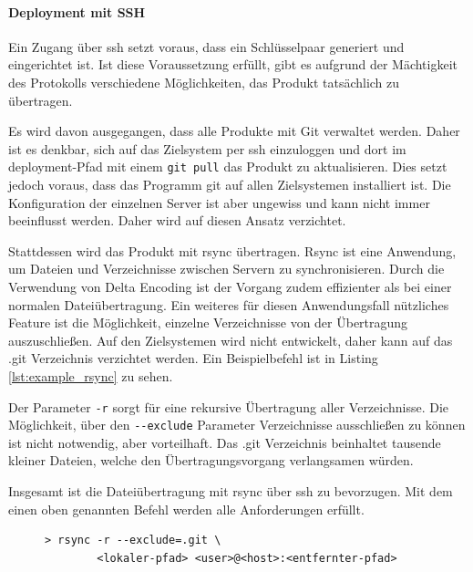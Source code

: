 \paragraph{Deployment mit SSH} %
\label{par:deployment_mit_ssh}

Ein Zugang über \gls{ssh} setzt voraus, dass ein Schlüsselpaar generiert und eingerichtet ist. Ist diese Voraussetzung erfüllt, gibt es aufgrund der Mächtigkeit des Protokolls verschiedene Möglichkeiten, das Produkt tatsächlich zu übertragen.

Es wird davon ausgegangen, dass alle Produkte mit Git verwaltet werden. Daher ist es denkbar, sich auf das Zielsystem per \gls{ssh} einzuloggen und dort im \Gls{deployment}-Pfad mit einem \lstinline!git pull! das Produkt zu aktualisieren. Dies setzt jedoch voraus, dass das Programm git auf allen Zielsystemen installiert ist. Die Konfiguration der einzelnen Server ist aber ungewiss und kann nicht immer beeinflusst werden. Daher wird auf diesen Ansatz verzichtet.

Stattdessen wird das Produkt mit \gls{rsync} übertragen. Rsync ist eine Anwendung, um Dateien und Verzeichnisse zwischen Servern zu synchronisieren. Durch die Verwendung von Delta Encoding ist der Vorgang zudem effizienter als bei einer normalen Dateiübertragung. Ein weiteres für diesen Anwendungsfall nützliches Feature ist die Möglichkeit, einzelne Verzeichnisse von der Übertragung auszuschließen. Auf den Zielsystemen wird nicht entwickelt, daher kann auf das .git Verzeichnis verzichtet werden. Ein Beispielbefehl ist in Listing \ref{lst:example_rsync} zu sehen.

Der Parameter \lstinline!-r! sorgt für eine rekursive Übertragung aller Verzeichnisse. Die Möglichkeit, über den \lstinline!--exclude! Parameter Verzeichnisse ausschließen zu können ist nicht notwendig, aber vorteilhaft. Das .git Verzeichnis beinhaltet tausende kleiner Dateien, welche den Übertragungsvorgang verlangsamen würden.

Insgesamt ist die Dateiübertragung mit rsync über \gls{ssh} zu bevorzugen. Mit dem einen oben genannten Befehl werden alle Anforderungen erfüllt.

\begin{figure}
	\begin{lstlisting}[caption=Beispiel rsync Befehl,label={lst:example_rsync}]
	> rsync -r --exclude=.git \
		<lokaler-pfad> <user>@<host>:<entfernter-pfad>
	\end{lstlisting}
\end{figure}

